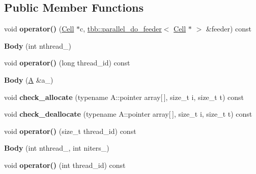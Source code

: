 \subsection*{Public Member Functions}
\begin{DoxyCompactItemize}
\item 
\hypertarget{classBody_a5e4e9ca48c61151c20e8a90805031dce}{}void {\bfseries operator()} (\hyperlink{classCell}{Cell} $\ast$c, \hyperlink{classtbb_1_1parallel__do__feeder}{tbb\+::parallel\+\_\+do\+\_\+feeder}$<$ \hyperlink{classCell}{Cell} $\ast$ $>$ \&feeder) const \label{classBody_a5e4e9ca48c61151c20e8a90805031dce}

\item 
\hypertarget{classBody_af112fc6adb27eef0d0e23cc65bad8def}{}{\bfseries Body} (int nthread\+\_\+)\label{classBody_af112fc6adb27eef0d0e23cc65bad8def}

\item 
\hypertarget{classBody_aaaa1c53d27a479ae4caabaa42e9d68ac}{}void {\bfseries operator()} (long thread\+\_\+id) const \label{classBody_aaaa1c53d27a479ae4caabaa42e9d68ac}

\item 
\hypertarget{classBody_ad55716c535d2f03d275cc0fff5f253af}{}{\bfseries Body} (\hyperlink{structA}{A} \&a\+\_\+)\label{classBody_ad55716c535d2f03d275cc0fff5f253af}

\item 
\hypertarget{classBody_ab24473bdf75319c7145952cb46063f5c}{}void {\bfseries check\+\_\+allocate} (typename A\+::pointer array\mbox{[}$\,$\mbox{]}, size\+\_\+t i, size\+\_\+t t) const \label{classBody_ab24473bdf75319c7145952cb46063f5c}

\item 
\hypertarget{classBody_a714e78d2de5544400a0c85bafe985985}{}void {\bfseries check\+\_\+deallocate} (typename A\+::pointer array\mbox{[}$\,$\mbox{]}, size\+\_\+t i, size\+\_\+t t) const \label{classBody_a714e78d2de5544400a0c85bafe985985}

\item 
\hypertarget{classBody_a2fb748a08baa1d4487f48cf875383eab}{}void {\bfseries operator()} (size\+\_\+t thread\+\_\+id) const \label{classBody_a2fb748a08baa1d4487f48cf875383eab}

\item 
\hypertarget{classBody_a73118b3d0ff4275dcaa2242139427bdc}{}{\bfseries Body} (int nthread\+\_\+, int niters\+\_\+)\label{classBody_a73118b3d0ff4275dcaa2242139427bdc}

\item 
\hypertarget{classBody_ae2dddd118d20de4cc53c7c248255f40a}{}void {\bfseries operator()} (int thread\+\_\+id) const \label{classBody_ae2dddd118d20de4cc53c7c248255f40a}


\end{DoxyCompactItemize}
